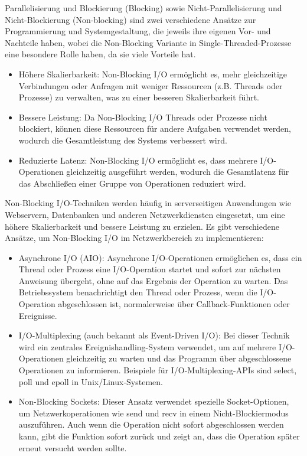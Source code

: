 Parallelisierung und Blockierung (Blocking) sowie Nicht-Parallelisierung und Nicht-Blockierung (Non-blocking) sind zwei verschiedene Ansätze zur Programmierung und Systemgestaltung, die jeweils ihre eigenen Vor- und Nachteile haben, wobei die Non-Blocking Variante in Single-Threaded-Prozesse eine besondere Rolle haben, da sie viele Vorteile hat. 
\begin{itemize}
\item Höhere Skalierbarkeit: Non-Blocking I/O ermöglicht es, mehr gleichzeitige Verbindungen oder Anfragen mit weniger Ressourcen (z.B. Threads oder Prozesse) zu verwalten, was zu einer besseren Skalierbarkeit führt.
\item Bessere Leistung: Da Non-Blocking I/O Threads oder Prozesse nicht blockiert, können diese Ressourcen für andere Aufgaben verwendet werden, wodurch die Gesamtleistung des Systems verbessert wird.
\item Reduzierte Latenz: Non-Blocking I/O ermöglicht es, dass mehrere I/O-Operationen gleichzeitig ausgeführt werden, wodurch die Gesamtlatenz für das Abschließen einer Gruppe von Operationen reduziert wird.
\end{itemize}
Non-Blocking I/O-Techniken werden häufig in serverseitigen Anwendungen wie Webservern, Datenbanken und anderen Netzwerkdiensten eingesetzt, um eine höhere Skalierbarkeit und bessere Leistung zu erzielen. Es gibt verschiedene Ansätze, um Non-Blocking I/O im Netzwerkbereich zu implementieren:
\begin{itemize}
\item Asynchrone I/O (AIO): Asynchrone I/O-Operationen ermöglichen es, dass ein Thread oder Prozess eine I/O-Operation startet und sofort zur nächsten Anweisung übergeht, ohne auf das Ergebnis der Operation zu warten. Das Betriebssystem benachrichtigt den Thread oder Prozess, wenn die I/O-Operation abgeschlossen ist, normalerweise über Callback-Funktionen oder Ereignisse.
\item I/O-Multiplexing (auch bekannt als Event-Driven I/O): Bei dieser Technik wird ein zentrales Ereignishandling-System verwendet, um auf mehrere I/O-Operationen gleichzeitig zu warten und das Programm über abgeschlossene Operationen zu informieren. Beispiele für I/O-Multiplexing-APIs sind select, poll und epoll in Unix/Linux-Systemen.
\item Non-Blocking Sockets: Dieser Ansatz verwendet spezielle Socket-Optionen, um Netzwerkoperationen wie send und recv in einem Nicht-Blockiermodus auszuführen. Auch wenn die Operation nicht sofort abgeschlossen werden kann, gibt die Funktion sofort zurück und zeigt an, dass die Operation später erneut versucht werden sollte.
\end{itemize}
